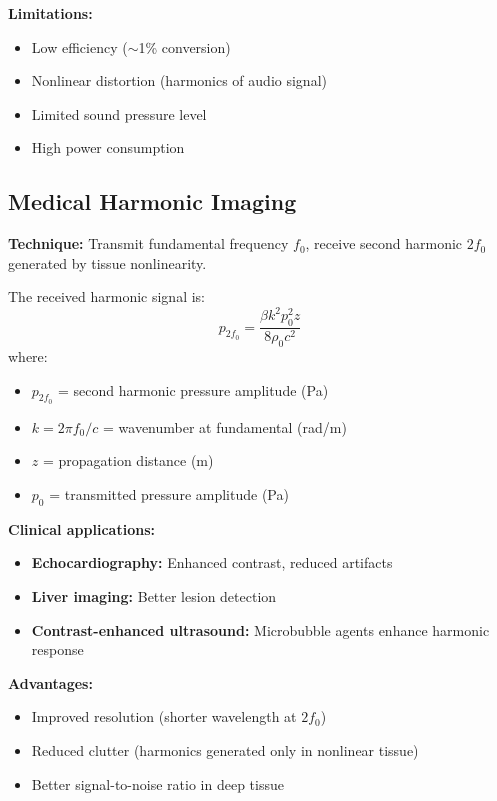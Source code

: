 \textbf{Limitations:}
\begin{itemize}
\item Low efficiency ($\sim$1\% conversion)
\item Nonlinear distortion (harmonics of audio signal)
\item Limited sound pressure level
\item High power consumption
\end{itemize}

\subsection{Medical Harmonic Imaging}

\textbf{Technique:} Transmit fundamental frequency $f_0$, receive second harmonic $2f_0$ generated by tissue nonlinearity.

The received harmonic signal is:
\begin{equation}
p_{2f_0} = \frac{\beta k^2 p_0^2 z}{8\rho_0 c^2}
\end{equation}
where:
\begin{itemize}
\item $p_{2f_0}$ = second harmonic pressure amplitude (Pa)
\item $k = 2\pi f_0/c$ = wavenumber at fundamental (rad/m)
\item $z$ = propagation distance (m)
\item $p_0$ = transmitted pressure amplitude (Pa)
\end{itemize}

\textbf{Clinical applications:}
\begin{itemize}
\item \textbf{Echocardiography:} Enhanced contrast, reduced artifacts
\item \textbf{Liver imaging:} Better lesion detection
\item \textbf{Contrast-enhanced ultrasound:} Microbubble agents enhance harmonic response
\end{itemize}

\textbf{Advantages:}
\begin{itemize}
\item Improved resolution (shorter wavelength at $2f_0$)
\item Reduced clutter (harmonics generated only in nonlinear tissue)
\item Better signal-to-noise ratio in deep tissue
\end{itemize}

